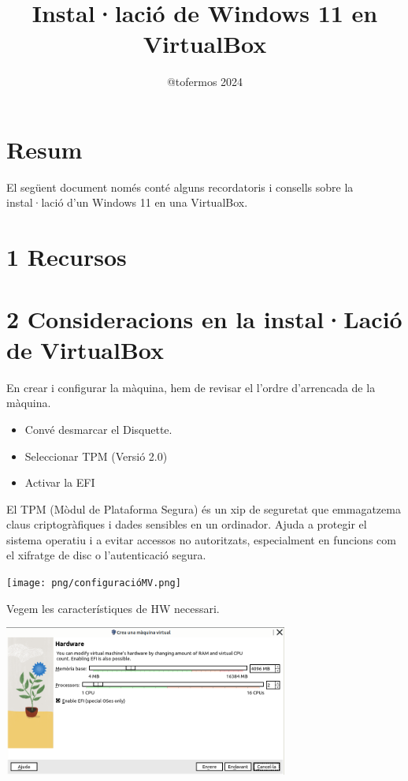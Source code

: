 \documentclass[
  a4paper,
]{article}
\title{Instal·lació de Windows 11 en VirtualBox}
\author{@tofermos 2024}
\date{}
\providecommand{\tightlist}{%
  \setlength{\itemsep}{0pt}\setlength{\parskip}{0pt}}
\begin{document}
\maketitle

{
\setcounter{tocdepth}{2}
\tableofcontents
}
\newpage

\renewcommand\tablename{Tabla}

\section{Resum}\label{resum}

El següent document només conté alguns recordatoris i consells sobre la
instal·lació d'un Windows 11 en una VirtualBox.

\section{1 Recursos}\label{recursos}

\section{2 Consideracions en la instal·Lació de
VirtualBox}\label{consideracions-en-la-installaciuxf3-de-virtualbox}

En crear i configurar la màquina, hem de revisar el l'ordre d'arrencada
de la màquina.

\begin{itemize}
\tightlist
\item
  Convé desmarcar el Disquette.
\item
  Seleccionar TPM (Versió 2.0)
\item
  Activar la EFI
\end{itemize}

El TPM (Mòdul de Plataforma Segura) és un xip de seguretat que
emmagatzema claus criptogràfiques i dades sensibles en un ordinador.
Ajuda a protegir el sistema operatiu i a evitar accessos no autoritzats,
especialment en funcions com el xifratge de disc o l'autenticació
segura.

\texttt{[image: png/configuracióMV.png]}

Vegem les característiques de HW necessari.

\includegraphics[width=0.7\textwidth,height=\textheight]{png/Hardware.png}
\end{document}
